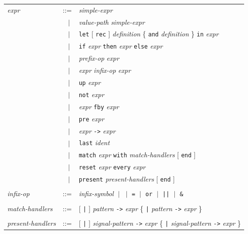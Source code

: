 \documentclass[11pt,titlepage,twoside]{report}
\newcommand{\alt}{\;|\;}
\newcommand{\Let}{\mbox{{\tt let}}}
\newcommand{\Rec}{\mbox{{\tt rec}}}
\newcommand{\In}{\mbox{{\tt in}}}
\newcommand{\And}{\mbox{{\tt and}}}
\newcommand{\Fun}{\mbox{{\tt fun}}}
\newcommand{\Function}{\mbox{{\tt function}}}
\newcommand{\If}{\mbox{{\tt if}}}
\newcommand{\Then}{\mbox{{\tt then}}}
\newcommand{\Else}{\mbox{{\tt else}}}
\newcommand{\Not}{\mbox{{\tt not}}}
\newcommand{\Up}{\mbox{{\tt up}}}
\newcommand{\Pre}{\mbox{{\tt pre}}}
\newcommand{\Last}{\mbox{{\tt last}}}
\newcommand{\Run}{\mbox{{\tt run}}}
\newcommand{\Fby}{\mbox{{\tt fby}}}
\newcommand{\Minusgreater}{\mbox{{\tt ->}}}
\renewcommand{\Reset}{\mbox{{\tt reset}}}
\newcommand{\Every}{\mbox{{\tt every}}}
\newcommand{\End}{\mbox{{\tt end}}}
\newcommand{\Match}[2]{\mbox{\tt match}\ #1\ \mbox{\tt with}\ #2 \End}
\newcommand{\term}[1]{{\tt #1}}
\newcommand{\nterm}[1]{{\em #1}}
\begin{document}
\begin{center}
\begin{tabular}{lcl}
\nterm{expr}
   & ::=        & \nterm{simple-expr} \\
   & $\;\;\alt$ & \nterm{value-path} \nterm{simple-expr} \\
   & $\;\;\alt$ & \term{\Let} [ \term{\Rec} ] \nterm{definition}
                  \{ \term{\And} \nterm{definition} \} \term{\In} 
                  \nterm{expr} \\
   & $\;\;\alt$ & \term{\If} \nterm{expr} \term{\Then} \nterm{expr}
                  \term{\Else} \nterm{expr} \\
   & $\;\;\alt$ & \nterm{prefix-op} \nterm{expr} \\
   & $\;\;\alt$ & \nterm{expr} \nterm{infix-op} \nterm{expr} \\
   & $\;\;\alt$ & \term{\Up} \nterm{expr} \\
   & $\;\;\alt$ & \term{\Not} \nterm{expr} \\
      & $\;\;\alt$ & \nterm{expr} \term{\Fby} \nterm{expr} \\
   & $\;\;\alt$ & \term{\Pre} \nterm{expr} \\
   & $\;\;\alt$ & \nterm{expr} \term{\Minusgreater} \nterm{expr} \\
   & $\;\;\alt$ & \term{\Last} \nterm{ident} \\
   & $\;\;\alt$ & \term{match} \nterm{expr} \term{with} 
                  \nterm{match-handlers} [ \term{end} ] \\
   & $\;\;\alt$ & \term{reset} \nterm{expr} \term{every} \nterm{expr} \\ 
   & $\;\;\alt$ & \term{present} \nterm{present-handlers} [ \term{end} ]
\\ \\
\nterm{infix-op}                
& ::=        &
                \nterm{infix-symbol} 
                $\alt$ \term{*} 
                $\alt$ \term{=} 
                $\alt$ \term{or}
                $\alt$ \term{||}  
                $\alt$ \term{\&}
\\
\\
\nterm{match-handlers}
   & ::=        & [ \term{|} ] 
                  \nterm{pattern} \term{\Minusgreater} \nterm{expr}
                  \{ \term{|} 
                  \nterm{pattern} \term{\Minusgreater} \nterm{expr} \}
\\
\\
\nterm{present-handlers}
   & ::=        & [ \term{|} ] 
                  \nterm{signal-pattern} \term{->} \nterm{expr}
                  \{ \term{|}
                  \nterm{signal-pattern} \term{->} \nterm{expr} \} 
\end{tabular}
\end{center}
\end{document}
